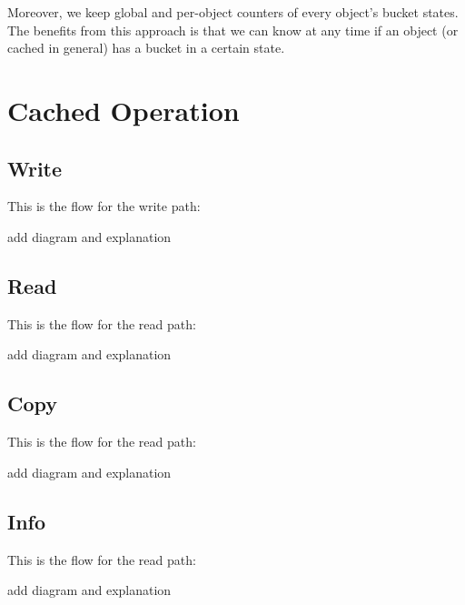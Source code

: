Moreover, we keep global and per-object counters of every object's bucket 
states. The benefits from this approach is that we can know at any time if an 
object (or cached in general) has a bucket in a certain state.

\section{Cached Operation}\label{sec:op-design}

\subsection{Write}

This is the flow for the write path:

\fixme add diagram and explanation

\subsection{Read}

This is the flow for the read path:

\fixme add diagram and explanation

\subsection{Copy}

This is the flow for the read path:

\fixme add diagram and explanation

\subsection{Info}

This is the flow for the read path:

\fixme add diagram and explanation

